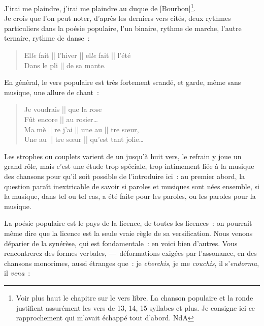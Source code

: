 \documentclass[french,twoside]{book} %
\begin{document}
J’irai me plaindre, j’irai me plaindre au duque de [Bourbon]\footnote{Voir plus haut le chapitre sur le vers libre. La chanson populaire et la ronde justifient assurément les vers de 13, 14, 15 syllabes et plus. Je consigne ici ce rapprochement qui m’avait échappé tout d’abord. NdA}.\\

\noindent Je crois que l’on peut noter, d’après les derniers vers cités, deux rythmes particuliers dans la poésie populaire, l’un binaire, rythme de marche, l’autre ternaire, rythme de danse :\par


\begin{verse}
El{\itshape le} fait || l’hiver || el{\itshape le} fait || l’été\\
Dans le pli || de sa mante.\\
\end{verse}

\noindent En général, le vers populaire est très fortement scandé, et garde, même sans musique, une allure de chant :\par


\begin{verse}
Je voudrais || que la rose\\
Fût encore || au rosier…\\
Ma mè || re j’ai || une au || tre sœur,\\
Une au || tre sœur || qu’est tant jolie…\\
\end{verse}

\noindent Les strophes ou couplets varient de un jusqu’à huit vers, le refrain y joue un grand rôle, mais c’est une étude trop spéciale, trop intimement liée à la musique des chansons pour qu’il soit possible de l’introduire ici : au premier abord, la question paraît inextricable de savoir si paroles et musiques sont nées ensemble, si la musique, dans tel ou tel cas, a été faite pour les paroles, ou les paroles pour la musique.\par
La poésie populaire est le pays de la licence, de toutes les licences : on pourrait même dire que la licence est la seule vraie règle de sa versification. Nous venons déparier de la synérèse, qui est fondamentale : en voici bien d’autres. Vous rencontrerez des formes verbales, — déformations exigées par l’assonance, en des chansons monorimes, aussi étranges que : je {\itshape cherchis}, je me {\itshape couchis}, il s’{\itshape endorma}, il {\itshape vena} :\par
\end{document}
